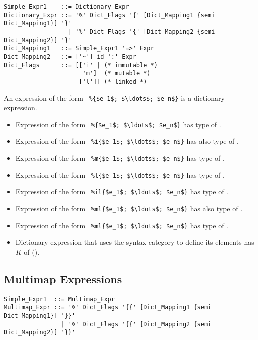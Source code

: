 \syntax\begin{lstlisting}
Simple_Expr1    ::= Dictionary_Expr
Dictionary_Expr ::= '%' Dict_Flags '{' [Dict_Mapping1 {semi Dict_Mapping1}] '}'
                  | '%' Dict_Flags '{' [Dict_Mapping2 {semi Dict_Mapping2}] '}'
Dict_Mapping1   ::= Simple_Expr1 '=>' Expr
Dict_Mapping2   ::= ['~'] id ':' Expr
Dict_Flags      ::= [['i' | (* immutable *)
                      'm']  (* mutable *)
                     ['l']] (* linked *)
\end{lstlisting}

An expression of the form ~\lstinline!%{$e_1$; $\ldots$; $e_n$}! is a dictionary expression. 

\begin{itemize}
  \item Expression of the form ~\lstinline!%{$e_1$; $\ldots$; $e_n$}!
    has type of . 
  \item Expression of the form ~\lstinline!%i{$e_1$; $\ldots$; $e_n$}!
    has also type of . 
  \item Expression of the form ~\lstinline!%m{$e_1$; $\ldots$; $e_n$}!
    has type of .
  \item Expression of the form ~\lstinline!%l{$e_1$; $\ldots$; $e_n$}!
    has type of . 
  \item Expression of the form ~\lstinline!%il{$e_1$; $\ldots$; $e_n$}!
    has type of . 
  \item Expression of the form ~\lstinline!%ml{$e_1$; $\ldots$; $e_n$}!
    has also type of .
  \item Expression of the form ~\lstinline!%ml{$e_1$; $\ldots$; $e_n$}!
    has type of .
  \item Dictionary expression that uses the  syntax category to define its elements has $K$ of  (). 
\end{itemize}





\subsection{Multimap Expressions}
\label{sec:multimap-expressions}

\syntax\begin{lstlisting}
Simple_Expr1  ::= Multimap_Expr
Multimap_Expr ::= '%' Dict_Flags '{{' [Dict_Mapping1 {semi Dict_Mapping1}] '}}'
                | '%' Dict_Flags '{{' [Dict_Mapping2 {semi Dict_Mapping2}] '}}'
\end{lstlisting}

